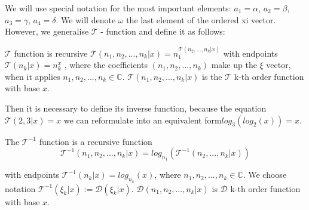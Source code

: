 We will use special notation for the most important elements: \(a_1 = \alpha\), 
\(a_2 = \beta\), \(a_3 = \gamma\), \(a_4 = \delta\). 
We will denote \(\omega\) the last element of the ordered xi vector. However, we
generalise \(\mathcal{T}\) - function and define it as follows:

\begin{definition}
\(\mathcal{T}\) function is recursive \(\mathcal{T}(n_1, n_2, ..., n_k | x) = 
n_1^{\mathcal{T}(n_2, ..., n_k | x)}\) with endpoints \(\mathcal{T}(n_k | x ) = n_k^x\) , 
where the coefficients  \((n_1, n_2, ..., n_k)\) make up the \(\xi\) vector,
 when it applies \(n_1, n_2, ..., n_k \in  \mathbb{C}\).  \(\mathcal{T}(n_1, 
 n_2, ..., n_k | x) \) is the \(\mathcal{T}\) k-th order function with base \(x\).
\end{definition}

Then it is necessary to define its inverse function, because the equation 
\(\mathcal{T}(2, 3 | x) = x\) we can reformulate into an equivalent 
form\(log_3(log_2(x)) = x\).

\begin{definition}
        The \(\mathcal{T}^{-1}\) function is a recursive function
        \begin{equation}
                \mathcal{T}^{-1}(n_1, n_2, ..., n_k | x) =
                log_{n_1}({\mathcal{T}^{-1}(n_2, ..., n_k | x)})
                \label{3}
        \end{equation}
        
with endpoints \(\mathcal{T}^{-1}(n_k | x ) = log_{n_k}(x)\), where 
\(n_1, n_2, ..., n_k \in  \mathbb{C}\). We choose notation 
\(\mathcal{T}^{-1}(\xi_k | x) := \mathcal{D}(\xi_k | x)\).
\(\mathcal{D}(n_1, n_2, ..., n_k | x) \) is \(\mathcal{D}\) 
k-th order function with base \(x\).

\end{definition}

